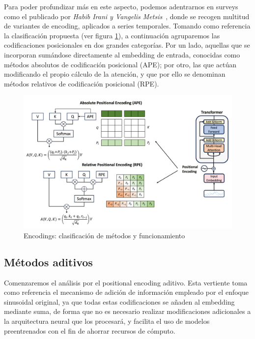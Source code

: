 Para poder profundizar más en este aspecto, podemos adentrarnos en surveys como el publicado por \textit{Habib Irani y Vangelis Metsis}~\cite{irani2025positionalencodingtransformerbasedtime}, donde se recogen multitud de variantes de encoding, aplicados a series temporales. Tomando como referencia la clasificación propuesta (ver figura \ref{encodings}), a continuación agruparemos las codificaciones posicionales en dos grandes categorías. Por un lado, aquellas que se incorporan sumándose directamente al embedding de entrada, conocidas como métodos absolutos de codificación posicional (APE); por otro, las que actúan modificando el propio cálculo de la atención, y que por ello se denominan métodos relativos de codificación posicional (RPE).


\begin{figure}[!ht]
	\centering
	\includegraphics[scale=0.275]{img/encodings.png}
	\caption{Encodings: clasificación de métodos y funcionamiento \cite{irani2025positionalencodingtransformerbasedtime}}
	\label{encodings}
\end{figure}

\subsection{Métodos aditivos}

Comenzaremos el análisis por el positional encoding aditivo. Esta vertiente toma como referencia el mecanismo de adición de información empleado por el enfoque sinusoidal original, ya que todas estas codificaciones se añaden al embedding mediante suma, de forma que no es necesario realizar modificaciones adicionales a la arquitectura neural que los procesará, y facilita el uso de modelos preentrenados con el fin de ahorrar recursos de cómputo.\\

